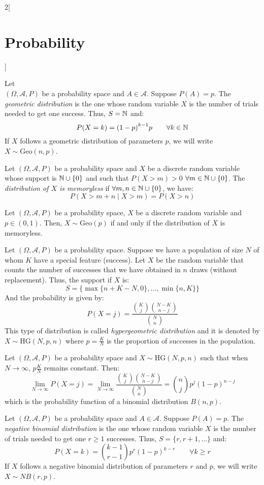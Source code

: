\documentclass[../../../main.tex]{subfiles}
\begin{document}
\begin{multicols}{2}[\section{Probability}]
\begin{theorem}
  \end{theorem}
  \begin{definition}
    Let\\ $(\Omega,\mathcal{A},P)$ be a probability space and $A\in\mathcal{A}$. Suppose $P(A)=p$. The \textit{geometric distribution} is the one whose random variable $X$ is the number of trials needed to get one success. Thus, $S=\mathbb{N}$ and: $$P(X=k)={(1-p)}^{k-1}p\qquad \forall k\in\mathbb{N}$$ If $X$ follows a geometric distribution of parameters $p$, we will write $X\sim \text{Geo}(n,p)$.
  \end{definition}
  \begin{definition}
    Let $(\Omega,\mathcal{A},P)$ be a probability space and $X$ be a discrete random variable whose support is $\mathbb{N}\cup\{0\}$ and such that $P(X >m)>0$ $\forall m\in\mathbb{N}\cup\{0\}$. The \textit{distribution of $X$ is memoryless} if $\forall m,n\in\mathbb{N}\cup\{0\}$, we have: $$P(X>m+n\mid X >m)=P(X>n)$$
  \end{definition}
  \begin{prop}
    Let $(\Omega,\mathcal{A},P)$ be a probability space, $X$ be a discrete random variable and $p\in(0,1)$. Then, $X\sim\text{Geo}(p)$ if and only if the distribution of $X$ is memoryless.
  \end{prop}
  \begin{definition}
    Let $(\Omega,\mathcal{A},P)$ be a probability space. Suppose we have a population of size $N$ of whom $K$ have a special feature (success). Let $X$ be the random variable that counts the number of successes that we have obtained in $n$ draws (without replacement). Thus, the support if $X$ is: $$S=\{\max\{n+K-N,0\},\ldots,\min\{n,K\}\}$$ And the probability is given by: $$P(X=j)=\frac{\binom{K}{j}\binom{N-K}{n-j}}{\binom{N}{n}}$$ This type of distribution is called \textit{hypergeometric distribution} and it is denoted by $X\sim \text{HG}(N,p,n)$ where $p=\frac{K}{N}$ is the proportion of successes in the population.
  \end{definition}
  \begin{theorem}
    Let $(\Omega,\mathcal{A},P)$ be a probability space and $X\sim \text{HG}(N,p,n)$ such that when $N\to\infty$, $p\frac{K}{N}$ remains constant. Then:
    $$\lim_{N\to\infty}P(X=j)=\lim_{N\to\infty}\frac{\binom{K}{j}\binom{N-K}{n-j}}{\binom{N}{n}}=\binom{n}{j}p^j{(1-p)}^{n-j}$$ which is the probability function of a binomial distribution $B(n,p)$.
  \end{theorem}
  \begin{definition}
    Let $(\Omega,\mathcal{A},P)$ be a probability space and $A\in\mathcal{A}$. Suppose $P(A)=p$. The \textit{negative binomial distribution} is the one whose random variable $X$ is the number of trials needed to get one $r\geq 1$ successes. Thus, $S=\{r,r+1,\ldots\}$ and: $$P(X=k)=\binom{k-1}{r-1}p^r{(1-p)}^{k-r}\qquad \forall k\geq r$$ If $X$ follows a negative binomial distribution of parameters $r$ and $p$, we will write $X\sim NB(r,p)$.
  \end{definition}

\end{multicols}
\end{document}
